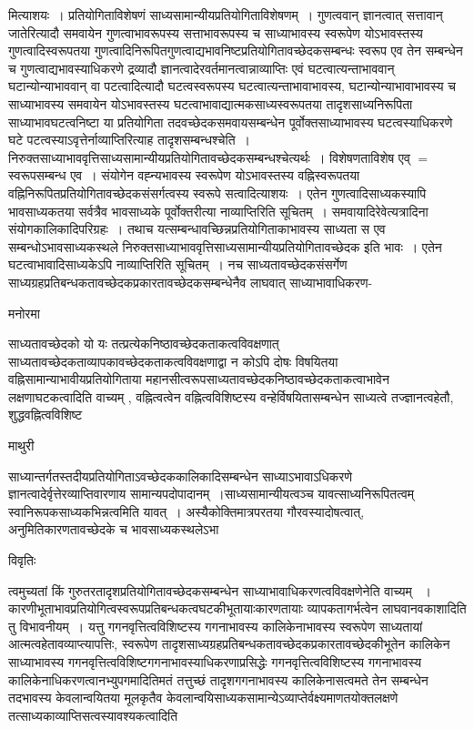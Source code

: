 \documentclass[10pt, openany]{book}
\begin{document}
{मित्याशयः~। प्रतियोगिताविशेषणं साध्यसामान्यीयप्रतियोगिताविशेषणम्~। गुणत्ववान् ज्ञानत्वात् सत्तावान् जातेरित्यादौ समवायेन गुणत्वाभावरूपस्य सत्ताभावरूपस्य च साध्याभावस्य स्वरूपेण योऽभावस्तस्य गुणत्वादिस्वरूपतया गुणत्वादिनिरूपितगुणत्वाद्यभावनिष्टप्रतियोगितावच्छेदकसम्बन्धः स्वरूप एव तेन सम्बन्धेन च गुणत्वाद्यभावस्याधिकरणे द्रव्यादौ ज्ञानत्वादेरवर्तमानत्वान्नाव्याप्तिः एवं घटत्वात्यन्ताभाववान् घटान्योन्याभाववान् वा पटत्वादित्यादौ घटत्वस्वरूपस्य घटत्वात्यन्ताभावाभावस्य, घटान्योन्याभावाभावस्य च साध्याभावस्य समवायेन योऽभावस्तस्य घटत्वाभावाद्यात्मकसाध्यस्वरूपतया तादृशसाध्यनिरूपिता साध्याभावघटत्वनिष्टा या प्रतियोगिता तदवच्छेदकसमवायसम्बन्धेन पूर्वोक्तसाध्याभावस्य घटत्वस्याधिकरणे घटे पटत्वस्याऽवृत्तेर्नाव्याप्तिरित्याह तादृशसम्बन्धश्चेति~।निरुक्तसाध्याभाववृत्तिसाध्यसामान्यीयप्रतियोगितावच्छेदकसम्बन्धश्चेत्यर्थः~। विशेषणताविशेष एव् $=$ स्वरूपसम्बन्ध एव~। संयोगेन वह्न्यभावस्य स्वरूपेण योऽभावस्तस्य वह्निस्वरूपतया वह्निनिरूपितप्रतियोगितावच्छेदकसंसर्गत्वस्य स्वरूपे सत्वादित्याशयः~। एतेन गुणत्वादिसाध्यकस्यापि भावसाध्यकतया सर्वत्रैव भावसाध्यके पूर्वोक्तरीत्या नाव्याप्तिरिति सूचितम्~। समवायादिरेवेत्यत्रादिना संयोगकालिकादिपरिग्रहः~। तथाच यत्सम्बन्धावच्छिन्नप्रतियोगिताकाभावस्य साध्यता स एव सम्बन्धोऽभावसाध्यकस्थले निरुक्तसाध्याभाववृत्तिसाध्यसामान्यीयप्रतियोगितावच्छेदक इति भावः~। एतेन घटत्वाभावादिसाध्यकेऽपि नाव्याप्तिरिति सूचितम्~। नच साध्यतावच्छेदकसंसर्गेण
साध्यग्रहप्रतिबन्धकतावच्छेदकप्रकारतावच्छेदकसम्बन्धेनैव लाघवात् साध्याभावाधिकरण-
\begin{center}   मनोरमा  \end{center}
साध्यतावच्छेदको यो यः तत्प्रत्येकनिष्ठावच्छेदकताकत्वविवक्षणात् साध्यतावच्छेदकताव्यापकावच्छेदकताकत्वविवक्षणाद्वा न कोऽपि दोषः विषयितया वह्निसामान्याभावीयप्रतियोगिताया महानसीत्वरूपसाध्यतावच्छेदकनिष्ठावच्छेदकताकत्वाभावेन लक्षणाघटकत्वादिति वाच्यम् , वह्नित्वत्वेन वह्नित्वविशिष्टस्य वन्हेर्विषयितासम्बन्धेन साध्यत्वे तज्ज्ञानत्वहेतौ, शुद्धवह्नित्वविशिष्ट
\newpage
\begin{center}  माथुरी  \end{center}
{\la साध्यान्तर्गतस्तदीयप्रतियोगिताऽवच्छेदककालिकादिसम्बन्धेन साध्याऽभावाऽधिकरणे ज्ञानत्वादेर्वृत्तेरव्याप्तिवारणाय सामान्यपदोपादानम्~।साध्यसामान्यीयत्वञ्च यावत्साध्यनिरूपितत्वम् स्वानिरूपकसाध्यकभिन्नत्वमिति यावत्~। अस्यैकोक्तिमात्रपरतया गौरवस्यादोषत्वात्, अनुमितिकारणतावच्छेदके च भावसाध्यकस्थलेऽभा}
\begin{center}     विवृतिः \end{center}
त्वमुच्यतां किं गुरुतरतादृशप्रतियोगितावच्छेदकसम्बन्धेन साध्याभावाधिकरणत्वविवक्षणेनेति वाच्यम्~ ।कारणीभूताभावप्रतियोगित्वस्वरूपप्रतिबन्धकत्वघटकीभूतायाःकारणतायाः व्यापकतागर्भत्वेन लाघवानवकाशादिति तु विभावनीयम्~। यत्तु गगनवृत्तित्वविशिष्टस्य गगनाभावस्य कालिकेनाभावस्य स्वरूपेण साध्यतायां आत्मत्वहेतावव्याप्त्यापत्तिः, स्वरूपेण तादृशसाध्यग्रहप्रतिबन्धकतावच्छेदकप्रकारतावच्छेदकीभूतेन कालिकेन साध्याभावस्य गगनवृत्तित्वविशिष्टगगनाभावस्याधिकरणाप्रसिद्धेः गगनवृत्तित्वविशिष्टस्य गगनाभावस्य कालिकेनाधिकरणत्वानभ्युपगमादितिमतं तत्तुच्छं तादृशगगनाभावस्य कालिकेनासत्वमते तेन सम्बन्धेन तदभावस्य केवलान्वयितया मूलकृतैव केवलान्वयिसाध्यकसामान्येऽव्याप्तेर्वक्ष्यमाणतयोक्तलक्षणे तत्साध्यकाव्याप्तिसत्वस्यावश्यकत्वादिति
}
\end{document}
